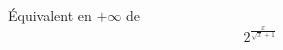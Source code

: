\'Equivalent en $+\infty$ de 
\begin{displaymath}
 2^{\frac{x}{\sqrt{x}+1}}
\end{displaymath}
\bigskip \bigskip
